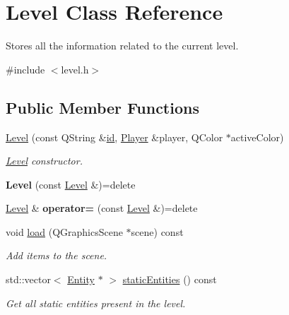 \hypertarget{class_level}{}\section{Level Class Reference}
\label{class_level}


Stores all the information related to the current level.  




{\ttfamily \#include $<$level.\+h$>$}

\subsection*{Public Member Functions}
\begin{DoxyCompactItemize}
\item 
\hyperlink{class_level_ae92fa1883989c6a0559d4ee8cd5f63e3}{Level} (const Q\+String \&\hyperlink{class_level_afa0e14e0f2233497373be981c5ffdfa8}{id}, \hyperlink{class_player}{Player} \&player, Q\+Color $\ast$active\+Color)
\begin{DoxyCompactList}\small\item\em \hyperlink{class_level}{Level} constructor. \end{DoxyCompactList}\item 
\mbox{\label{class_level_ae03636cc90bd5f178650bd366124cb1c}} 
{\bfseries Level} (const \hyperlink{class_level}{Level} \&)=delete
\item 
\mbox{\label{class_level_acbd996c953d3e3436cafddbf476cdba0}} 
\hyperlink{class_level}{Level} \& {\bfseries operator=} (const \hyperlink{class_level}{Level} \&)=delete
\item 
void \hyperlink{class_level_a04991c68f0868041b33f376252010aef}{load} (Q\+Graphics\+Scene $\ast$scene) const
\begin{DoxyCompactList}\small\item\em Add items to the scene. \end{DoxyCompactList}\item 
std\+::vector$<$ \hyperlink{class_entity}{Entity} $\ast$ $>$ \hyperlink{class_level_a350978da950c180a22a8d108138a3eb8}{static\+Entities} () const
\begin{DoxyCompactList}\small\item\em Get all static entities present in the level. \end{DoxyCompactList}\item 

\end{DoxyCompactItemize}
